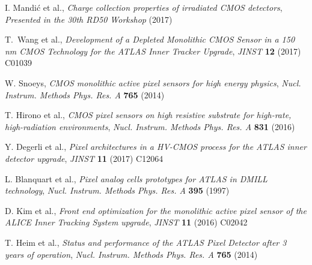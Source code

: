 \documentclass[a4paper,11pt]{article}
\begin{document}
\begin{thebibliography}{99}
I. Mandi\'{c} et al., \emph{Charge collection properties of irradiated CMOS detectors}, \emph{Presented in the 30th RD50 Workshop} (2017)

T.~Wang et al., \emph{Development of a Depleted Monolithic CMOS Sensor in a 150 nm CMOS Technology for the ATLAS Inner Tracker Upgrade}, \emph{JINST} {\bf 12} (2017) C01039

W. Snoeys, \emph{CMOS monolithic active pixel sensors for high energy physics}, \emph{Nucl. Instrum. Methods Phys. Res. A} {\bf 765} (2014)

T. Hirono et al., \emph{CMOS pixel sensors on high resistive substrate for high-rate, high-radiation environments}, \emph{Nucl. Instrum. Methods Phys. Res. A} {\bf 831} (2016)


Y. Degerli et al., \emph{Pixel architectures in a HV-CMOS process for the ATLAS inner detector upgrade}, \emph{JINST} {\bf 11} (2017) C12064

L. Blanquart et al., \emph{Pixel analog cells prototypes for ATLAS in DMILL technology}, \emph{Nucl. Instrum. Methods Phys. Res. A} {\bf 395} (1997)

D. Kim et al., \emph{Front end optimization for the monolithic active pixel sensor of the ALICE Inner Tracking System upgrade}, \emph{JINST} {\bf 11} (2016) C02042

T. Heim et al., \emph{Status and performance of the ATLAS Pixel Detector after 3 years of operation}, \emph{Nucl. Instrum. Methods Phys. Res. A} {\bf 765} (2014)






\end{thebibliography}
\end{document}
